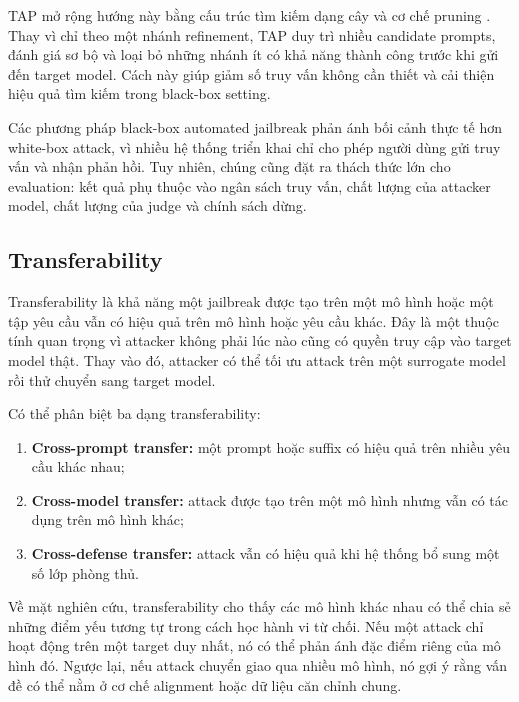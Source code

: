 TAP mở rộng hướng này bằng cấu trúc tìm kiếm dạng cây và cơ chế pruning
\cite{mehrotra2023tap}. Thay vì chỉ theo một nhánh refinement, TAP duy trì
nhiều candidate prompts, đánh giá sơ bộ và loại bỏ những nhánh ít có khả
năng thành công trước khi gửi đến target model. Cách này giúp giảm số truy
vấn không cần thiết và cải thiện hiệu quả tìm kiếm trong black-box setting.

Các phương pháp black-box automated jailbreak phản ánh bối cảnh thực tế
hơn white-box attack, vì nhiều hệ thống triển khai chỉ cho phép người dùng
gửi truy vấn và nhận phản hồi. Tuy nhiên, chúng cũng đặt ra thách thức lớn
cho evaluation: kết quả phụ thuộc vào ngân sách truy vấn, chất lượng của
attacker model, chất lượng của judge và chính sách dừng.

\subsection{Transferability}
\label{subsec:jailbreak-transferability}

Transferability là khả năng một jailbreak được tạo trên một mô hình hoặc
một tập yêu cầu vẫn có hiệu quả trên mô hình hoặc yêu cầu khác. Đây là một
thuộc tính quan trọng vì attacker không phải lúc nào cũng có quyền truy cập
vào target model thật. Thay vào đó, attacker có thể tối ưu attack trên một
surrogate model rồi thử chuyển sang target model.

Có thể phân biệt ba dạng transferability:

\begin{enumerate}[leftmargin=1.2cm]
    \item \textbf{Cross-prompt transfer:}
    một prompt hoặc suffix có hiệu quả trên nhiều yêu cầu khác nhau;

    \item \textbf{Cross-model transfer:}
    attack được tạo trên một mô hình nhưng vẫn có tác dụng trên mô hình
    khác;

    \item \textbf{Cross-defense transfer:}
    attack vẫn có hiệu quả khi hệ thống bổ sung một số lớp phòng thủ.
\end{enumerate}

Về mặt nghiên cứu, transferability cho thấy các mô hình khác nhau có thể
chia sẻ những điểm yếu tương tự trong cách học hành vi từ chối. Nếu một
attack chỉ hoạt động trên một target duy nhất, nó có thể phản ánh đặc điểm
riêng của mô hình đó. Ngược lại, nếu attack chuyển giao qua nhiều mô hình,
nó gợi ý rằng vấn đề có thể nằm ở cơ chế alignment hoặc dữ liệu căn chỉnh
chung.

